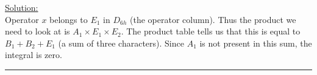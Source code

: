 \noindent
\underline{Solution:}\\

\noindent
Operator $x$ belongs to $E_1$ in $D_{6h}$ (the operator column). Thus the product we need to look at is $A_1\times E_1\times E_2$.
The product table tells us that this is equal to $B_1 + B_2 + E_1$ (a sum of three characters). Since $A_1$ is not present in this
sum, the integral is zero.\\

\hrule\vspace{0.5cm}
